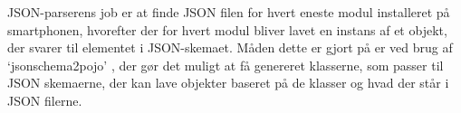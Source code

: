 JSON-parserens job er at finde JSON filen for hvert eneste modul installeret på smartphonen, hvorefter der for hvert modul bliver lavet en instans af et objekt, der svarer til  elementet i JSON-skemaet.
Måden dette er gjort på er ved brug af `jsonschema2pojo' \citep{jsonpojo}, der gør det muligt at få genereret klasserne, som passer til JSON skemaerne, der kan lave objekter baseret på de klasser og hvad der står i JSON filerne.